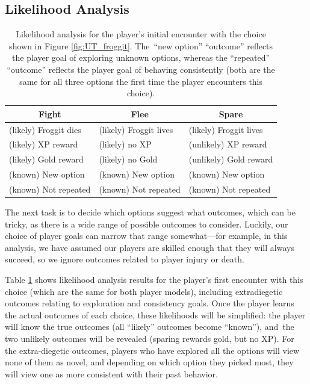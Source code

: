 \documentclass[arts,article,accept,moreauthors,pdftex,10pt,a4paper]{Definitions/mdpi}
\begin{document}
\subsection{Likelihood Analysis}

\begin{table}[b]
\centering
\begin{tabular}{l l l}
  \toprule
 \multicolumn{1}{c}{\textbf{Fight}} & \multicolumn{1}{c}{\textbf{Flee}} & \multicolumn{1}{c}{\textbf{Spare}} \\
  \midrule
 (likely) Froggit dies & (likely) Froggit lives & (likely) Froggit lives \\
 (likely) XP reward & (likely) no XP & (unlikely) XP reward \\
 (likely) Gold reward & (likely) no Gold & (unlikely) Gold reward \\
 (known) New option & (known) New option & (known) New option \\
 (known) Not repeated & (known) Not repeated & (known) Not repeated \\
  \bottomrule
\end{tabular}
  \caption[\emph{Undertale} likelihood analysis]{Likelihood analysis for the player's initial encounter with the choice shown in Figure \ref{fig:UT_froggit}. The~``new option'' ``outcome'' reflects the player goal of exploring unknown options, whereas the ``repeated'' ``outcome'' reflects the player goal of behaving consistently (both are the same for all three options the first time the player encounters this choice).}
\label{tab:UT_likelihoods}
\end{table}

The next task is to decide which options suggest what outcomes, which can be tricky, as there is a wide range of possible outcomes to consider.
%
Luckily, our choice of player goals can narrow that range somewhat---for example, in this analysis, we have assumed our players are skilled enough that they will always succeed, so we ignore outcomes related to player injury or death.


Table \ref{tab:UT_likelihoods} shows likelihood analysis results for the player's first encounter with this choice (which are the same for both player models), including extradiegetic outcomes relating to exploration and consistency goals.
%
Once the player learns the actual outcomes of each choice, these likelihoods will be simplified: the player will know the true outcomes (all ``likely'' outcomes become ``known''), and~the two unlikely outcomes will be revealed (sparing rewards gold, but no XP).
%
For the extra-diegetic outcomes, players who have explored all the options will view none of them as novel, and depending on which option they picked most, they will view one as more consistent with their past behavior.
\end{document}
